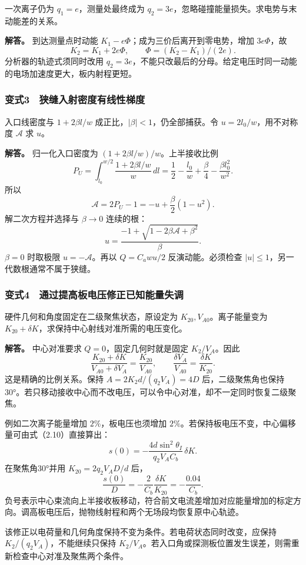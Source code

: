 \documentclass[12pt,a4paper,fontset=fandol]{ctexart}
\begin{document}
一次离子仍为 \(q_1=e\)，测量处最终成为
\(q_2=3e\)，忽略碰撞能量损失。求电势与末动能差的关系。

\textbf{解答。} 到达测量点时动能
\(K_1-e\Phi\)；成为三价后离开到零电势，增加 \(3e\Phi\)，故 \[
K_2=K_1+2e\Phi,\qquad
\boxed{\Phi=(K_2-K_1)/(2e).}
\] 分析器的轨迹式须同时改用
\(q_2=3e\)，不能只改最后的分母。给定电压时同一动能的电场加速度更大，板内射程更短。

\subsubsection{变式3　狭缝入射密度有线性梯度}\label{ux53d8ux5f0f3-ux72edux7f1dux5165ux5c04ux5bc6ux5ea6ux6709ux7ebfux6027ux68afux5ea6}

入口线密度与 \(1+2\beta l/w\) 成正比，\(|\beta|<1\)，仍全部捕获。令
\(u=2l_0/w\)，用不对称度 \(\mathcal A\) 求 \(u\)。

\textbf{解答。} 归一化入口密度为 \((1+2\beta l/w)/w\)。上半接收比例 \[
P_U=\int_{l_0}^{w/2}\frac{1+2\beta l/w}{w}\,dl
=\frac12-\frac{l_0}{w}+\frac\beta4-\frac{\beta l_0^2}{w^2}.
\] 所以 \[
\mathcal A=2P_U-1=-u+\frac\beta2(1-u^2).
\] 解二次方程并选择与 \(\beta\to0\) 连续的根： \[
\boxed{u=\frac{-1+\sqrt{1-2\beta\mathcal A+\beta^2}}{\beta}.}
\] \(\beta=0\) 时取极限 \(u=-\mathcal A\)。再以 \(Q=C_awu/2\)
反演动能。必须检查 \(|u|\le1\)，另一代数根通常不属于狭缝。

\noindent\begin{minipage}{\linewidth}
\subsubsection{变式4　通过提高板电压修正已知能量失调}\label{ux53d8ux5f0f4-ux901aux8fc7ux63d0ux9ad8ux677fux7535ux538bux4feeux6b63ux5df2ux77e5ux80fdux91cfux5931ux8c03}

硬件几何和角度固定在二级聚焦状态，原设定为
\(K_{20},V_{A0}\)。离子能量变为
\(K_{20}+\delta K\)，求保持中心射线对准所需的电压变化。

\textbf{解答。} 中心对准要求 \(Q=0\)，固定几何时就是固定
\(K_2/V_A\)。因此 \[
\frac{K_{20}+\delta K}{V_{A0}+\delta V_A}
=\frac{K_{20}}{V_{A0}},
\qquad
\boxed{\frac{\delta V_A}{V_{A0}}=\frac{\delta K}{K_{20}}.}
\] 这是精确的比例关系。保持 \(A=2K_2d/(q_2V_A)=4D\)
后，二级聚焦角也保持30°。若只移动接收中心而不改电压，可以令中心对准，却不一定同时恢复二级聚焦。

例如二次离子能量增加 \(2\%\)，板电压也须增加
\(2\%\)。若保持板电压不变，中心偏移量可由式（2.10）直接算出： \[
s(0)=-\frac{4d\sin^2\theta_I}{q_2V_AC_b}\,\delta K.
\] 在聚焦角30°并用 \(K_{20}=2q_2V_AD/d\) 后， \[
\frac{s(0)}D=-\frac2{C_b}\frac{\delta K}{K_{20}}
=-\frac{0.04}{C_b}.
\]
负号表示中心束流向上半接收板移动，符合前文电流差增加对应能量增加的标定方向。调高板电压后，抛物线射程和两个无场段均恢复原中心轨迹。

该修正以电荷量和几何角度保持不变为条件。若电荷状态同时改变，应保持
\(K_2/(q_2V_A)\)，不能继续只保持
\(K_2/V_A\)。若入口角或探测板位置发生误差，则需重新检查中心对准及聚焦两个条件。


\end{minipage}
\end{document}
